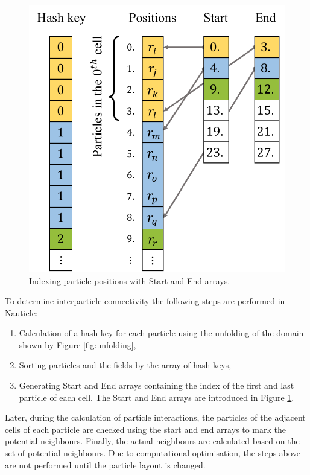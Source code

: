 \documentclass[a4paper,12pt,openany]{book}
\theoremstyle{break}
\begin{document}
\begin{figure}[h!]
  \includegraphics[scale=0.6]{nnsearch.pdf}
  \centering
  \caption{Indexing particle positions with Start and End arrays.}
  \label{fig:nnsearch}
\end{figure}\vspace*{3pt}

To determine interparticle connectivity the following steps are performed in Nauticle:
\begin{enumerate}
  \item Calculation of a hash key for each particle using the unfolding of the domain shown by Figure \ref{fig:unfolding},
  \item Sorting particles and the fields by the array of hash keys,
  \item Generating Start and End arrays containing the index of the first and last particle of each cell. The Start and End arrays are introduced in Figure \ref{fig:nnsearch}.
\end{enumerate}
Later, during the calculation of particle interactions, the particles of the adjacent cells of each particle are checked using the start and end arrays to mark the potential neighbours. Finally, the actual neighbours are calculated based on the set of potential neighbours. Due to computational optimisation, the steps above are not performed until the particle layout is changed.
\end{document}
